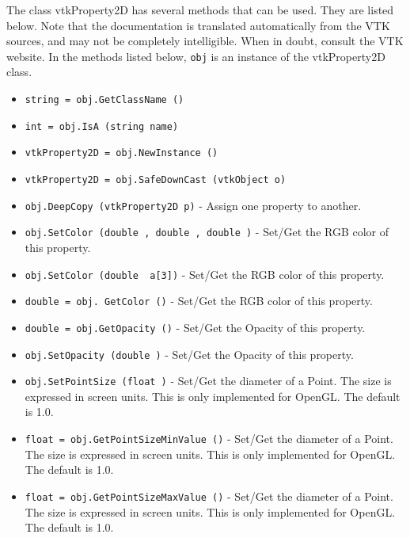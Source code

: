 The class vtkProperty2D has several methods that can be used.
  They are listed below.
Note that the documentation is translated automatically from the VTK sources,
and may not be completely intelligible.  When in doubt, consult the VTK website.
In the methods listed below, \verb|obj| is an instance of the vtkProperty2D class.
\begin{itemize}
\item  \verb|string = obj.GetClassName ()|

\item  \verb|int = obj.IsA (string name)|

\item  \verb|vtkProperty2D = obj.NewInstance ()|

\item  \verb|vtkProperty2D = obj.SafeDownCast (vtkObject o)|

\item  \verb|obj.DeepCopy (vtkProperty2D p)| -  Assign one property to another. 

\item  \verb|obj.SetColor (double , double , double )| -  Set/Get the RGB color of this property.

\item  \verb|obj.SetColor (double  a[3])| -  Set/Get the RGB color of this property.

\item  \verb|double = obj. GetColor ()| -  Set/Get the RGB color of this property.

\item  \verb|double = obj.GetOpacity ()| -  Set/Get the Opacity of this property.

\item  \verb|obj.SetOpacity (double )| -  Set/Get the Opacity of this property.

\item  \verb|obj.SetPointSize (float )| -  Set/Get the diameter of a Point. The size is expressed in screen units.
 This is only implemented for OpenGL. The default is 1.0.

\item  \verb|float = obj.GetPointSizeMinValue ()| -  Set/Get the diameter of a Point. The size is expressed in screen units.
 This is only implemented for OpenGL. The default is 1.0.

\item  \verb|float = obj.GetPointSizeMaxValue ()| -  Set/Get the diameter of a Point. The size is expressed in screen units.
 This is only implemented for OpenGL. The default is 1.0.


\end{itemize}
